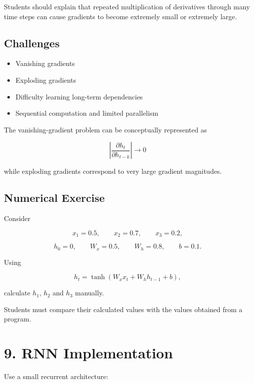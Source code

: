 \documentclass[10pt]{article}
\begin{document}
Students should explain that repeated multiplication of derivatives through
many time steps can cause gradients to become extremely small or extremely
large.

\subsection*{Challenges}

\begin{itemize}
\item Vanishing gradients
\item Exploding gradients
\item Difficulty learning long-term dependencies
\item Sequential computation and limited parallelism
\end{itemize}

The vanishing-gradient problem can be conceptually represented as

\[
\left|\frac{\partial h_t}{\partial h_{t-k}}\right|\rightarrow0
\]

while exploding gradients correspond to very large gradient magnitudes.

\subsection*{Numerical Exercise}

Consider

\[
x_1=0.5,\qquad x_2=0.7,\qquad x_3=0.2,
\]

\[
h_0=0,\qquad W_x=0.5,\qquad W_h=0.8,\qquad b=0.1.
\]

Using

\[
h_t=\tanh(W_xx_t+W_hh_{t-1}+b),
\]

calculate $h_1$, $h_2$ and $h_3$ manually.

Students must compare their calculated values with the values obtained from
a program.

\section*{9. RNN Implementation}

Use a small recurrent architecture:

\begin{center}
\end{center}
\end{document}

